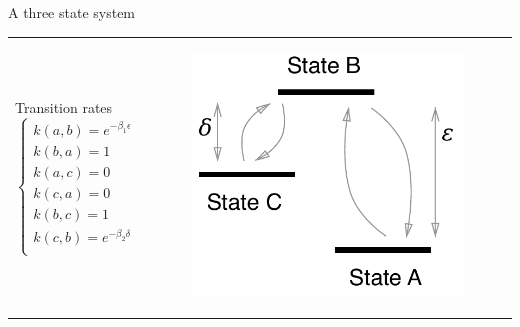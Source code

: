 \begin{frame}{A three state system}
\begin{tabular}{l l}
	\begin{minipage}{0.61\textwidth}
		\begin{block}{Transition rates}
			\begin{equation*}
				\begin{cases}
				k(a,b)=e^{-\beta_1\epsilon}\\
				k(b,a)=1\\
				k(a,c) = 0\\
				k(c,a)=0\\
				k(b,c)=1\\
				k(c,b)=e^{-\beta_2\delta}\\
				\end{cases}
			\end{equation*}
		\end{block}
	\end{minipage}
	&
	\begin{minipage}{0.4\textwidth}
		\begin{figure}
			\centering
			\includegraphics[width=\textwidth]{../src/figure/Simple_3_State_System.pdf}
		\end{figure}
	\end{minipage}
	\end{tabular}
\end{frame}
